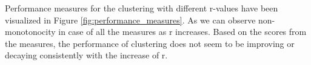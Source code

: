 \documentclass{article}
\begin{document}
Performance measures for the clustering with different r-values have been visualized in Figure \ref{fig:performance_measures}. As we can observe non-monotonocity in case of all the measures as r increases. Based on the scores from the measures, the performance of clustering does not seem to be improving or decaying consistently with the increase of r. \\ 

\begin{figure}[!ht]%
	\centering
		\qquad
		\qquad
		\qquad

\end{figure}
\end{document}
